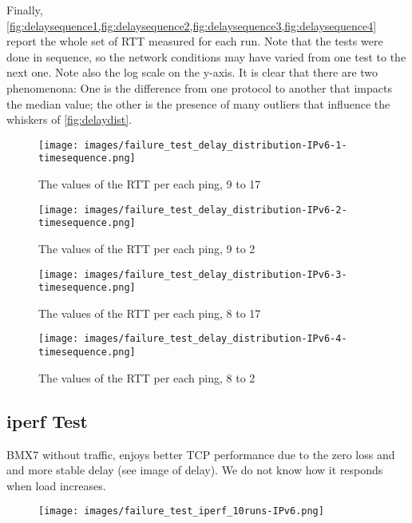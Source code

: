 \documentclass[10pt,onecolumn]{paper}
\begin{document}
Finally,
\cref{fig:delaysequence1,fig:delaysequence2,fig:delaysequence3,fig:delaysequence4}
report the whole set of RTT measured for each run. Note that the tests were done
in sequence, so the network conditions may have varied from one test to the next
one. Note also the log scale on the y-axis. It is clear that there are two
phenomenona: One is the difference from one protocol to another that impacts the
median value; the other is the presence of many outliers that influence the
whiskers of \cref{fig:delaydist}.

\begin{figure}
  \centering
  \texttt{[image: images/failure\_test\_delay\_distribution-IPv6-1-timesequence.png]}
    \caption{The values of the RTT per each ping, 9 to 17}
  \label{fig:delaysequence1}
\end{figure}

\begin{figure}
  \centering
  \texttt{[image: images/failure\_test\_delay\_distribution-IPv6-2-timesequence.png]}
    \caption{The values of the RTT per each ping, 9 to 2}
  \label{fig:delaysequence2}
\end{figure}

\begin{figure}
  \centering
  \texttt{[image: images/failure\_test\_delay\_distribution-IPv6-3-timesequence.png]}
    \caption{The values of the RTT per each ping, 8 to 17}
  \label{fig:delaysequence3}
\end{figure}

\begin{figure}
  \centering
  \texttt{[image: images/failure\_test\_delay\_distribution-IPv6-4-timesequence.png]}
    \caption{The values of the RTT per each ping, 8 to 2}
  \label{fig:delaysequence4}
\end{figure}

\subsection{iperf Test}

BMX7 without traffic, enjoys better TCP performance due to the zero loss and
and more stable delay (see image of delay). We do not know how it responds when load increases.
\begin{figure}
  \centering
    \texttt{[image: images/failure\_test\_iperf\_10runs-IPv6.png]}
    \caption{}
  \label{fig:iperfnoflow}
\end{figure}
\end{document}
